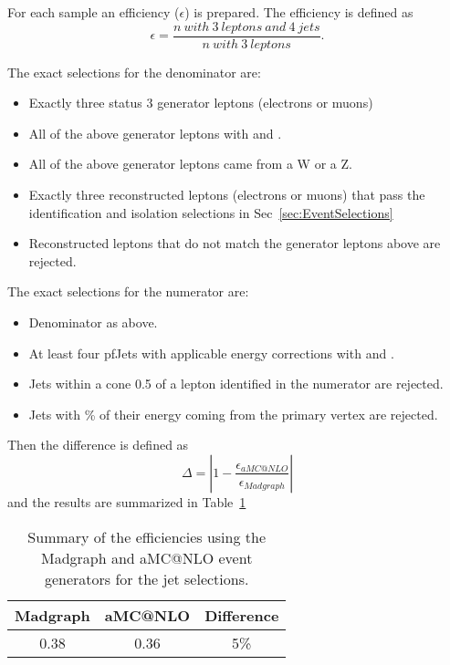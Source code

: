 For each sample an efficiency ($\epsilon$) is prepared. The efficiency is defined as
\begin{equation}
\epsilon = \frac{n\ with\ 3\ leptons\ and\ 4\ jets}{n\ with\ 3\ leptons}.
\end{equation}

The exact selections for the denominator are:
\begin{itemize}
\item Exactly three status 3 generator leptons (electrons or muons)
\item All of the above generator leptons with \pt {} \GeV and \aeta {}.
\item All of the above generator leptons came from a W or a Z.
\item Exactly three reconstructed leptons (electrons or muons) that pass the identification and isolation selections in Sec~\ref{sec:EventSelections}
\item Reconstructed leptons that do not match the generator leptons above are rejected.
\end{itemize}

The exact selections for the numerator are:
\begin{itemize}
\item Denominator as above.
\item At least four pfJets with applicable energy corrections with \pt {} \GeV and \aeta {}. 
\item Jets within a cone 0.5 of a lepton identified in the numerator are rejected.
\item Jets with \% of their energy coming from the primary vertex are rejected.
\end{itemize}

Then the difference is defined as
\begin{equation}
\Delta = | 1 - \frac{\epsilon _{aMC@NLO}}{\epsilon _{Madgraph}} |
\end{equation}
and the results are summarized in Table~\ref{tab:systgeneratorsum}

\begin{table}[h]
\caption{\label{tab:systgeneratorsum} Summary of the efficiencies using the Madgraph and aMC@NLO event generators for the jet selections.}
\begin{center}
\begin{tabular}{ccc}\hline
Madgraph           &  aMC@NLO & Difference \\ \hline
0.38                      & 0.36              & 5\%\\
\hline
\end{tabular}
\end{center}
\end{table}

